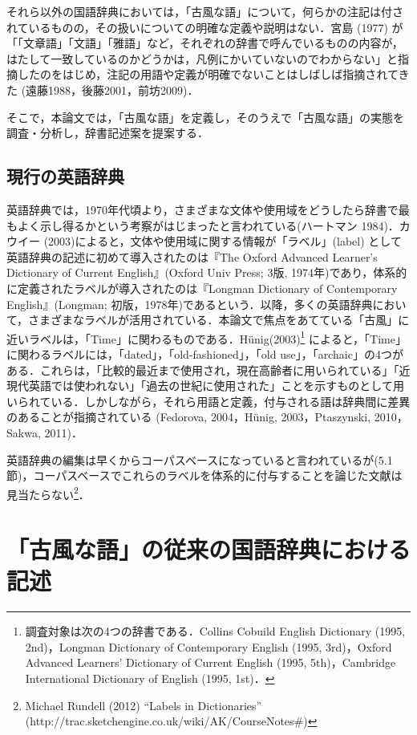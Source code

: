 \documentclass[japanese]{jnlp_1.4}
\begin{document}
それら以外の国語辞典においては，「古風な語」について，何らかの注記は付されているものの，その扱いについての明確な定義や説明はない．宮島 (1977) が「「文章語」「文語」「雅語」など，それぞれの辞書で呼んでいるものの内容が，はたして一致しているのかどうかは，凡例にかいていないのでわからない」と指摘したのをはじめ，注記の用語や定義が明確でないことはしばしば指摘されてきた (遠藤1988，後藤2001，前坊2009)．

そこで，本論文では，「古風な語」を定義し，そのうえで「古風な語」の実態を調査・分析し，辞書記述案を提案する．


\subsection{現行の英語辞典}

英語辞典では，1970年代頃より，さまざまな文体や使用域をどうしたら辞書で最もよく示し得るかという考察がはじまったと言われている(ハートマン 1984)．カウイー (2003)によると，文体や使用域に関する情報が「ラベル」(label) として英語辞典の記述に初めて導入されたのは『The 
Oxford Advanced Learner's Dictionary of Current English』(Oxford Univ Press; 3版, 1974年)であり，体系的に定義されたラベルが導入されたのは『Longman 
Dictionary of Contemporary English』(Longman; 初版，1978年)であるという．以降，多くの英語辞典において，さまざまなラベルが活用されている．本論文で焦点をあてている「古風」に近いラベルは，「Time」に関わるものである．H\"{u}nig(2003)\footnote{調査対象は次の4つの辞書である．Collins Cobuild English Dictionary (1995, 2nd)，Longman Dictionary of Contemporary English (1995, 3rd)，Oxford Advanced Learners' Dictionary of Current English (1995, 5th)，Cambridge International Dictionary of English (1995, 1st)．} によると，「Time」に関わるラベルには，「dated」，「old-fashioned」，「old use」，「archaic」の4つがある．これらは，「比較的最近まで使用され，現在高齢者に用いられている」「近現代英語では使われない」「過去の世紀に使用された」ことを示すものとして用いられている．しかしながら，それら用語と定義，付与される語は辞典間に差異のあることが指摘されている (Fedorova, 2004，H\"{u}nig, 2003，Ptaszynski, 2010，Sakwa, 2011)．

英語辞典の編集は早くからコーパスベースになっていると言われているが(5.1節)，コーパスベースでこれらのラベルを体系的に付与することを論じた文献は見当たらない\footnote{Michael Rundell (2012) ``Labels in Dictionaries'' (http://trac.sketchengine.co.uk/wiki/AK/CourseNotes{\#})}．


\section{「古風な語」の従来の国語辞典における記述}
\end{document}
